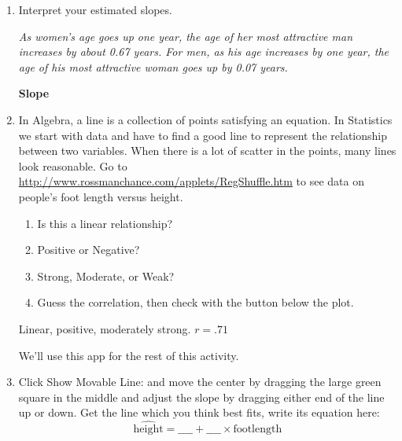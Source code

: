 \begin{enumerate}
\begin{key}
  {\it Women: as x goes from 20 to 45, I'd guess y goes from 25 to 40,
    so slope is roughly 15/25 = .6\\
        Men: going from 20 to 50 might raise the $y$ value by 2 so
        slope estimate could be 2/30 = 0.067  }
\end{key}

\item Interpret your estimated slopes.
\begin{students}
 \vspace{2cm}      
\end{students}

\begin{key}
  {\it  As women's age goes up one year, the age of her most
    attractive man increases by about 0.67 years.  For men, as his age
  increases by one year, the age of his most attractive woman goes up
  by 0.07 years.}
\end{key}


\begin{center}
  {\bf Slope}
\end{center}

\item  In Algebra, a line is a collection of points satisfying an
     equation. In Statistics we start with data and have to find a good
     line to represent the relationship between two variables.  When
     there is a lot of scatter in the points, many lines look
     reasonable.  Go to 
     \url{http://www.rossmanchance.com/applets/RegShuffle.htm}
     to see data on people's foot length versus height.
     \begin{enumerate}
     \item Is this a linear relationship? \\
     \item Positive or Negative? \\
     \item Strong, Moderate, or Weak? \\
     \item Guess the correlation, then check with the button below the
       plot.
     \end{enumerate}
\begin{key}
 Linear, positive, moderately strong.      $ r = .71$  
\end{key}

   We'll use this app for the rest of this activity.

\item Click {\sf Show Movable Line:} \fbox{$\surd$} and move the
  center by dragging the large green square in the middle and adjust
  the slope by dragging either end of the line up or down.  Get the
  line which you think best fits, write its equation here:
  $$ \widehat{\mbox{height}} = \_\_\_\_ + \_\_\_\_ \times \mbox{footlength}$$
\begin{students}
 \vspace{.2cm}      
\end{students}


\end{enumerate}

